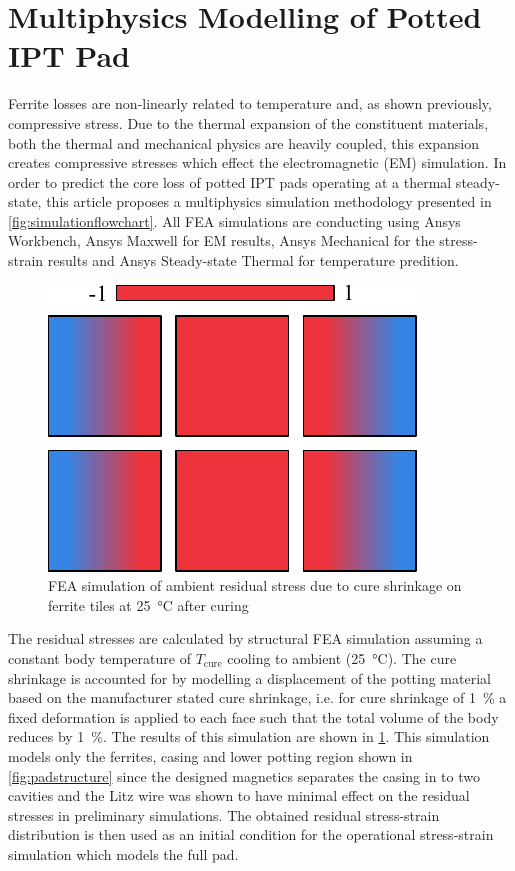 \documentclass[conference]{IEEEtran}
\begin{document}
\lipsum[1]

\section{Multiphysics Modelling of Potted IPT Pad}
\label{sec:modelling}

Ferrite losses are non-linearly related to temperature and, as shown previously, compressive stress. 
Due to the thermal expansion of the constituent materials, both the thermal and mechanical physics are heavily coupled, this expansion creates compressive stresses which effect the electromagnetic (EM) simulation. 
In order to predict the core loss of potted IPT pads operating at a thermal steady-state, this article proposes a multiphysics simulation methodology presented in \cref{fig:simulationflowchart}. 
All FEA simulations are conducting using Ansys Workbench, Ansys Maxwell for EM results, Ansys Mechanical for the stress-strain results and Ansys Steady-state Thermal for temperature predition. 

\begin{figure}[t]
  \centering
  \includegraphics{figures/simulatedpottingpadstresses.pdf}
  \caption{FEA simulation of ambient residual stress due to cure shrinkage on ferrite tiles at \SI{25}{\celsius} after curing}
  \label{fig:pottingstresses}
\end{figure}

The residual stresses are calculated by structural FEA simulation assuming a constant body temperature of $T_\text{cure}$ cooling to ambient (\SI{25}{\celsius}). 
The cure shrinkage is accounted for by modelling a displacement of the potting material based on the manufacturer stated cure shrinkage, i.e. for cure shrinkage of \SI{1}{\percent} a fixed deformation is applied to each face such that the total volume of the body reduces by \SI{1}{\percent}.
The results of this simulation are shown in \cref{fig:pottingstresses}. 
This simulation models only the ferrites, casing and lower potting region shown in \cref{fig:padstructure} since the designed magnetics separates the casing in to two cavities and the Litz wire was shown to have minimal effect on the residual stresses in preliminary simulations. 
The obtained residual stress-strain distribution is then used as an initial condition for the operational stress-strain simulation which models the full pad. 
\end{document}
